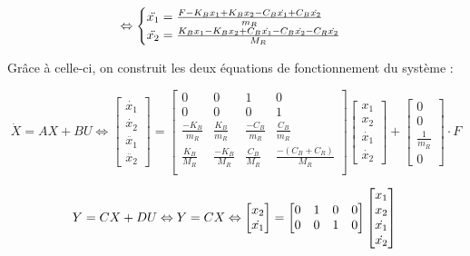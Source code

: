 \documentclass[a4paper,11pt]{article}
\begin{document}
\begin{equation}
    \\ \Leftrightarrow
    \begin{cases}
        \ddot{x_1} = \frac{F - K_B x_1 + K_B x_2 - C_B \dot{x_1} + C_B \dot{x_2}}{m_R} \\
        \ddot{x_2} = \frac{K_B x_1 - K_B x_2 + C_B \dot{x_1} - C_B \dot{x_2} - C_R \dot{x_2}}{M_R}
    \end{cases}
    \label{eq:SommeDesForces}
\end{equation}

Grâce à celle-ci, on construit les deux équations de fonctionnement du système :

\begin{equation}
    \dot{X}=AX+BU
    \Leftrightarrow
    \begin{bmatrix}
        \dot{x_1}\\
        \dot{x_2}\\
        \ddot{x_1}\\
        \ddot{x_2}
    \end{bmatrix}
    =
    \begin{bmatrix}
        0 & 0 & 1 & 0\\
        0 & 0 & 0 & 1\\
        \frac{-K_B}{m_R} & \frac{K_B}{m_R} & \frac{-C_B}{m_R} & \frac{C_B}{m_R}\\
        \frac{K_B}{M_R} & \frac{-K_B}{M_R} & \frac{C_B}{M_R} & \frac{-(C_B+C_R)}{M_R}\\
    \end{bmatrix}
    \begin{bmatrix}
        x_1\\
        x_2\\
        \dot{x_1}\\
        \dot{x_2}
    \end{bmatrix}
    +
    \begin{bmatrix}
        0\\
        0\\
        \frac{1}{m_R}\\
        0
    \end{bmatrix}
    \cdot F
    \label{eq:VarEtatXDot}
\end{equation}

\begin{equation}
    Y=CX+DU
    \Leftrightarrow
    Y=CX
    \Leftrightarrow
    \begin{bmatrix}
        x_2\\
        \dot{x_1}
    \end{bmatrix}
    =
    \begin{bmatrix}
        0 & 1 & 0 & 0\\
        0 & 0 & 1 & 0
    \end{bmatrix}
    \begin{bmatrix}
        x_1\\
        x_2\\
        \dot{x_1}\\
        \dot{x_2}
    \end{bmatrix}\\
    \label{eq:VarEtatY}
\end{equation}
\end{document}
